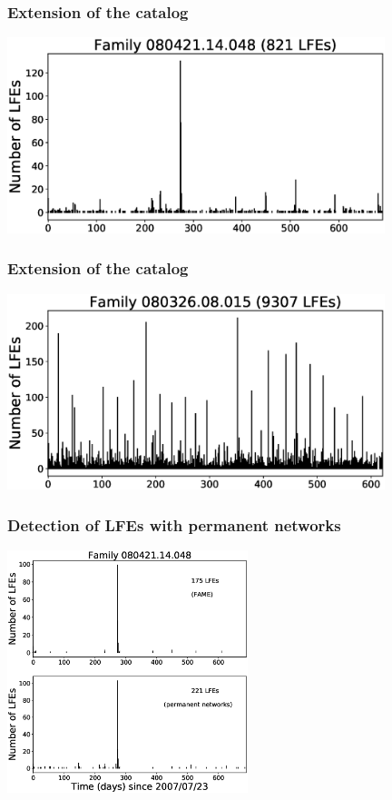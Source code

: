 \documentclass{beamer}
\begin{document}
	\begin{frame}
		\frametitle{Extension of the catalog}
		\begin{center}
			\includegraphics[width=11cm, trim={0cm 0cm 0cm 0cm}, clip]{catalog_SC/08042114048_FAME.eps}
		\end{center}
	\end{frame}
	
	\begin{frame}
		\frametitle{Extension of the catalog}
		\begin{center}
			\includegraphics[width=11cm, trim={0cm 0cm 0cm 0cm}, clip]{catalog_SC/08032608015_FAME.eps}
		\end{center}
	\end{frame}

	\begin{frame}
		\frametitle{Detection of LFEs with permanent networks}
		\begin{center}
			\includegraphics[width=7cm, trim={0cm 0cm 0cm 2cm}, clip]{catalog_SC/08042114048_permanent.eps}
		\end{center}
	\end{frame}
\end{document}
